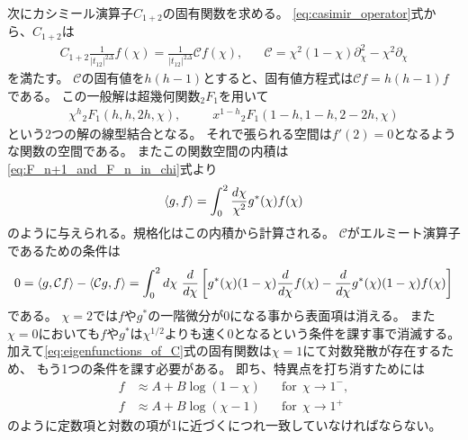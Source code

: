 次にカシミール演算子$C_{1+2}$の固有関数を求める。
\eqref{eq:casimir_operator}式から、$C_{1+2}$は
\begin{align}
	C_{1+2}\frac{1}{|t_{12}|^{2\Delta}}f(\chi)
	= \frac{1}{|t_{12}|^{2\Delta}}\mathcal{C}f(\chi),\hspace{20pt}
	\mathcal{C} = \chi^2(1 - \chi)\partial_{\chi}^2 - \chi^2\partial_{\chi}
\end{align}
を満たす。
$\mathcal{C}$の固有値を$h(h-1)$とすると、固有値方程式は$\mathcal{C}f = h(h-1)f$である。
この一般解は超幾何関数${}_2F_1$を用いて
\begin{align}
	\chi^h{}_2F_1(h, h, 2h, \chi),\hspace{30pt}
	x^{1-h}{}_2F_1(1-h, 1-h, 2-2h, \chi)
	\label{eq:eigenfunctions_of_C}
\end{align}
という2つの解の線型結合となる。
それで張られる空間は$f'(2) = 0$となるような関数の空間である。
またこの関数空間の内積は\eqref{eq:F_n+1_and_F_n_in_chi}式より
\begin{align}
	\langle g, f \rangle = \int_0^2 \frac{d\chi}{\chi^2}g^*(\chi)f(\chi)
	\label{eq:innerproduct}
\end{align}
のように与えられる。規格化はこの内積から計算される。
$\mathcal{C}$がエルミート演算子であるための条件は
\begin{align}
	0
	= \langle g, \mathcal{C}f \rangle - \langle \mathcal{C}g, f \rangle
	= \int_0^2 d\chi\ \frac{d}{d\chi}\left[
		g^*(\chi)(1 - \chi)\frac{d}{d\chi}f(\chi)
		- \frac{d}{d\chi}g^*(\chi)(1 - \chi)f(\chi)
	\right]
\end{align}
である。
$\chi = 2$では$f$や$g^*$の一階微分が0になる事から表面項は消える。
また$\chi = 0$においても$f$や$g^*$は$\chi^{1/2}$よりも速く0となるという条件を課す事で消滅する。
加えて\eqref{eq:eigenfunctions_of_C}式の固有関数は$\chi = 1$にて対数発散が存在するため、
もう1つの条件を課す必要がある。
即ち、特異点を打ち消すためには
\begin{align}
	f &\approx A + B\log(1 - \chi)\hspace{20pt}\mathrm{for\ \ }\chi \to 1^-,\nonumber\\
	f &\approx A + B\log(\chi - 1)\hspace{20pt}\mathrm{for\ \ }\chi \to 1^+\nonumber
\end{align}
のように定数項と対数の項が1に近づくにつれ一致していなければならない。


